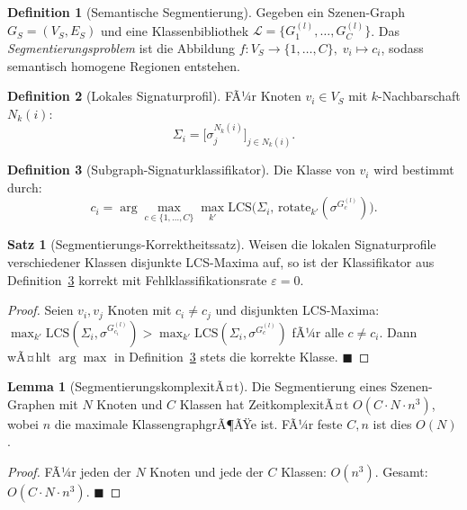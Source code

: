 ﻿\documentclass[a4paper,12pt]{article}
\theoremstyle{definition}
\newtheorem{definition}{Definition}[section]
\newtheorem{satz}{Satz}[section]
\newtheorem{lemma}{Lemma}[section]
\begin{document}
\begin{definition}[Semantische Segmentierung]
  \label{def:segmentierung}
  Gegeben ein Szenen-Graph $G_S = (V_S, E_S)$ und eine
  Klassenbibliothek $\mathcal{L} = \{G_1^{(l)}, \ldots, G_C^{(l)}\}$.
  Das \emph{Segmentierungsproblem} ist die Abbildung
  $f: V_S \to \{1,\ldots,C\},\; v_i \mapsto c_i$,
  sodass semantisch homogene Regionen entstehen.
\end{definition}

\begin{definition}[Lokales Signaturprofil]
  \label{def:sig_profil}
  FÃ¼r Knoten $v_i \in V_S$ mit $k$-Nachbarschaft $N_k(i)$:
  \[
    \Sigma_i = \bigl[\sigma_j^{N_k(i)}\bigr]_{j \in N_k(i)}.
  \]
\end{definition}

\begin{definition}[Subgraph-Signaturklassifikator]
  \label{def:sig_klassifikator}
  Die Klasse von $v_i$ wird bestimmt durch:
  \[
    c_i = \arg\max_{c \in \{1,\ldots,C\}} \max_{k'}
          \mathrm{LCS}\!\bigl(\Sigma_i,\,
          \mathrm{rotate}_{k'}(\sigma^{G_c^{(l)}})\bigr).
  \]
\end{definition}

\begin{satz}[Segmentierungs-Korrektheitssatz]
  \label{satz:segmentierung}
  Weisen die lokalen Signaturprofile verschiedener Klassen
  disjunkte LCS-Maxima auf, so ist der Klassifikator aus
  Definition~\ref{def:sig_klassifikator} korrekt mit
  Fehlklassifikationsrate $\varepsilon = 0$.
\end{satz}

\begin{proof}
  Seien $v_i, v_j$ Knoten mit $c_i \neq c_j$ und disjunkten
  LCS-Maxima: $\max_{k'} \mathrm{LCS}(\Sigma_i,
  \sigma^{G_{c_i}^{(l)}}) > \max_{k'} \mathrm{LCS}(\Sigma_i,
  \sigma^{G_c^{(l)}})$ fÃ¼r alle $c \neq c_i$. Dann wÃ¤hlt $\arg\max$
  in Definition~\ref{def:sig_klassifikator} stets die korrekte
  Klasse. \hfill$\blacksquare$
\end{proof}

\begin{lemma}[SegmentierungskomplexitÃ¤t]
  \label{lem:seg_komplexitaet}
  Die Segmentierung eines Szenen-Graphen mit $N$ Knoten und $C$
  Klassen hat ZeitkomplexitÃ¤t $O(C \cdot N \cdot n^3)$, wobei $n$
  die maximale KlassengraphgrÃ¶ÃŸe ist. FÃ¼r feste $C, n$ ist dies
  $O(N)$.
\end{lemma}

\begin{proof}
  FÃ¼r jeden der $N$ Knoten und jede der $C$ Klassen: $O(n^3)$.
  Gesamt: $O(C \cdot N \cdot n^3)$. \hfill$\blacksquare$
\end{proof}
\end{document}
